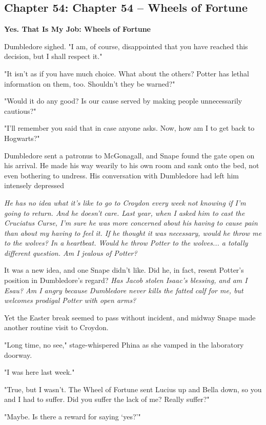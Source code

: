 \documentclass[a4paper,11pt]{article}
\begin{document}
\subsection{Chapter 54: Chapter 54 – Wheels of Fortune}

\textbf{Yes. That Is My Job: Wheels of Fortune}

Dumbledore sighed. "I am, of course, disappointed that you have reached this decision, but I shall respect it."

"It isn't as if you have much choice. What about the others? Potter has lethal information on them, too. Shouldn't they be warned?"

"Would it do any good? Is our cause served by making people unnecessarily cautious?"

"I'll remember you said that in case anyone asks. Now, how am I to get back to Hogwarts?"

Dumbledore sent a patronus to McGonagall, and Snape found the gate open on his arrival. He made his way wearily to his own room and sank onto the bed, not even bothering to undress. His conversation with Dumbledore had left him intensely depressed

\emph{He has no idea what it's like to go to Croydon every week not knowing if I'm going to return. And he doesn't care. Last year, when I asked him to cast the Cruciatus Curse, I'm sure he was more concerned about his having to cause pain than about my having to feel it. If he thought it was necessary, would he throw me to the wolves? In a heartbeat. Would he throw Potter to the wolves... a totally different question. Am I jealous of Potter?}

It was a new idea, and one Snape didn't like. Did he, in fact, resent Potter's position in Dumbledore's regard? \emph{Has Jacob stolen Isaac's blessing, and am I Esau? Am I angry because Dumbledore never kills the fatted calf for me, but welcomes prodigal Potter with open arms?}

Yet the Easter break seemed to pass without incident, and midway Snape made another routine visit to Croydon.

"Long time, no see," stage-whispered Phina as she vamped in the laboratory doorway.

"I was here last week."

"True, but I wasn't. The Wheel of Fortune sent Lucius up and Bella down, so you and I had to suffer. Did you suffer the lack of me? Really suffer?"

"Maybe. Is there a reward for saying `yes?'"
\end{document}
